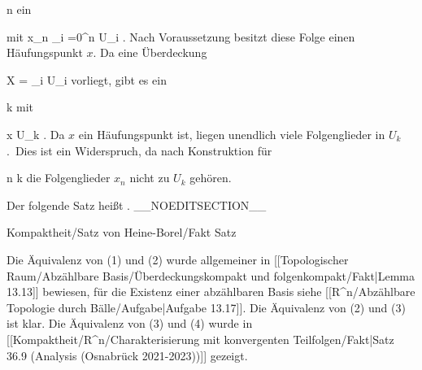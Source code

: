 {{\mavergleichskette
{\vergleichskette
{ n
}
{ \in }{ \N
}
{  }{
}
{    }{
}
{   }{
}
}
{}{}{}
ein

 {mit}
 {x_n \not\in \bigcup_{i =0}^n  U_i} {}
 {} {} {} {.}
Nach Voraussetzung besitzt diese Folge einen Häufungspunkt $x$. Da eine Überdeckung

\mavergleichskette
{\vergleichskette
{ X
}
{ = }{ \bigcup_{i \in \N} U_i
}
{  }{
}
{    }{
}
{   }{
}
}
{}{}{}
vorliegt, gibt es ein

\mavergleichskette
{\vergleichskette
{ k
}
{ \in }{ \N
}
{  }{
}
{    }{
}
{   }{
}
}
{}{}{}
mit

\mavergleichskette
{\vergleichskette
{ x
}
{ \in }{ U_k
}
{  }{
}
{    }{
}
{   }{
}
}
{}{}{.}
Da $x$ ein Häufungspunkt ist, liegen unendlich viele Folgenglieder in $U_k$. Dies ist ein Widerspruch, da nach Konstruktion für

\mavergleichskette
{\vergleichskette
{ n
}
{ \geq }{ k
}
{  }{
}
{    }{
}
{   }{
}
}
{}{}{}
die Folgenglieder $x_n$ nicht zu $U_k$ gehören.}
{}

}

Der folgende Satz heißt  {.}
__NOEDITSECTION__

{Kompaktheit/Satz von Heine-Borel/Fakt}
{Satz}
{}
{

\faktzusatz {}
\faktzusatz {}

}
{

\teilbeweis {}{}{}
{Die Äquivalenz von (1) und (2) wurde allgemeiner in
[[Topologischer Raum/Abzählbare Basis/Überdeckungskompakt und folgenkompakt/Fakt|Lemma 13.13]]
bewiesen, für die Existenz einer abzählbaren Basis siehe
[[R^n/Abzählbare Topologie durch Bälle/Aufgabe|Aufgabe 13.17]].}
{}
\teilbeweis {}{}{}
{Die Äquivalenz von (2) und (3) ist klar.}
{}
\teilbeweis {}{}{}
{Die Äquivalenz von (3) und (4) wurde in
[[Kompaktheit/R^n/Charakterisierung mit konvergenten Teilfolgen/Fakt|Satz 36.9 (Analysis (Osnabrück 2021-2023))]]
gezeigt.}
{}

}

